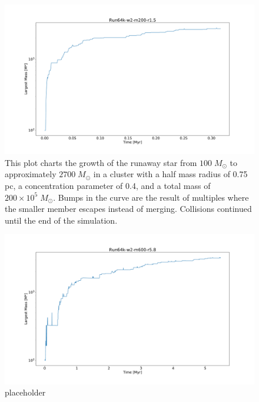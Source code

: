 \documentclass{princeton_astro_thesis}
\newcommand\Msun{\; M_\odot}
\numberwithin{equation}{section}
\begin{document}
\begin{figure}
\centering
\includegraphics[width=\textwidth]{MaxMassTime2-200-15}
\caption{This plot charts the growth of the runaway star from $100 \Msun$ to approximately $2700 \Msun$ in a cluster with a half mass radius of 0.75 pc, a concentration parameter of 0.4, and a total mass of $200 \times 10^5 \Msun$. Bumps in the curve are the result of multiples where the smaller member escapes instead of merging. Collisions continued until the end of the simulation.}
\label{fig:MaxMass2-200-1.5}
\end{figure}

\begin{figure}
\centering
\includegraphics[width=\textwidth]{MaxMassTime-2-600-58}
\caption{placeholder}
\label{fig:MaxMass2-600-5.8}
\end{figure}
\end{document}
